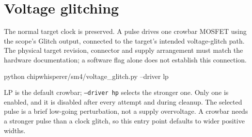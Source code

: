 \section{Voltage glitching}
The normal target clock is preserved. A pulse drives one crowbar MOSFET using the scope's Glitch output, connected to the target's intended voltage-glitch path. The physical target revision, connector and supply arrangement must match the hardware documentation; a software flag alone does not establish this connection.
\begin{lightcode}
python chipwhisperer/sm4/voltage_glitch.py --driver lp
\end{lightcode}
LP is the default crowbar; \texttt{--driver hp} selects the stronger one. Only one is enabled, and it is disabled after every attempt and during cleanup. The selected pulse is a brief low-going perturbation, not a supply overvoltage. A crowbar needs a stronger pulse than a clock glitch, so this entry point defaults to wider positive widths.

